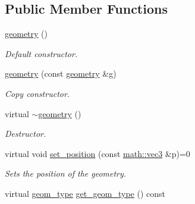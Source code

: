 \subsection*{Public Member Functions}
\begin{DoxyCompactItemize}
\item 
\mbox{\label{classphysim_1_1geom_1_1geometry_ac2a470e60350243d18b53b3982e924b9}} 
\hyperlink{classphysim_1_1geom_1_1geometry_ac2a470e60350243d18b53b3982e924b9}{geometry} ()
\begin{DoxyCompactList}\small\item\em Default constructor. \end{DoxyCompactList}\item 
\mbox{\label{classphysim_1_1geom_1_1geometry_a31a9cdaa7607d17afd9db4907a3900db}} 
\hyperlink{classphysim_1_1geom_1_1geometry_a31a9cdaa7607d17afd9db4907a3900db}{geometry} (const \hyperlink{classphysim_1_1geom_1_1geometry}{geometry} \&g)
\begin{DoxyCompactList}\small\item\em Copy constructor. \end{DoxyCompactList}\item 
\mbox{\label{classphysim_1_1geom_1_1geometry_a6119894c28c2d0b01578a0adae817a9d}} 
virtual \hyperlink{classphysim_1_1geom_1_1geometry_a6119894c28c2d0b01578a0adae817a9d}{$\sim$geometry} ()
\begin{DoxyCompactList}\small\item\em Destructor. \end{DoxyCompactList}\item 
virtual void \hyperlink{classphysim_1_1geom_1_1geometry_adbd7c270a0b49c2c6d085457a20bfa69}{set\+\_\+position} (const \hyperlink{structphysim_1_1math_1_1vec3}{math\+::vec3} \&p)=0
\begin{DoxyCompactList}\small\item\em Sets the position of the geometry. \end{DoxyCompactList}\item 
\mbox{\label{classphysim_1_1geom_1_1geometry_aaa22af683c10fd3dc1da96c44311aac9}} 
virtual \hyperlink{namespacephysim_1_1geom_a473d69ab4667a730784b37b67fa4b658}{geom\+\_\+type} \hyperlink{classphysim_1_1geom_1_1geometry_aaa22af683c10fd3dc1da96c44311aac9}{get\+\_\+geom\+\_\+type} () const

\end{DoxyCompactItemize}
